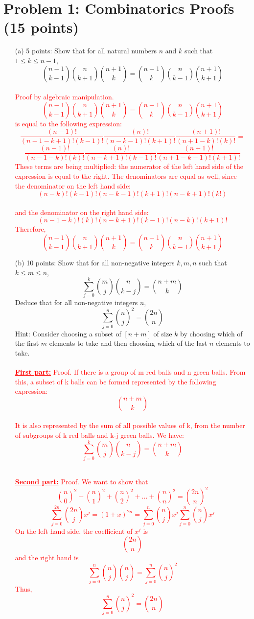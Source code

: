 \documentclass[12pt]{article}
\begin{document}
\section*{Problem 1: Combinatorics Proofs (15 points)}
\begin{enumerate}
\item[(a)] 5 points: Show that for all natural numbers $n$ and $k$ such that $1 \leq k \leq n-1$, 
\[
\binom{n-1}{k-1}\binom{n}{k+1}\binom{n+1}{k} = \binom{n-1}{k}\binom{n}{k-1}\binom{n+1}{k+1}
\]
\\ \textcolor{red}{Proof by algebraic manipulation.  \[\binom{n-1}{k-1}
\binom{n}{k+1}
\binom{n+1}{k} = 
\binom{n-1}{k}
\binom{n}{k-1}
\binom{n+1}{k+1}
\] is equal to the following expression:
\[\frac{(n-1)!}{(n-1-k+1)!(k-1)!}
\frac{(n)!}{(n-k-1)!(k+1)!}
\frac{(n+1)!}{(n+1-k)!(k)!} = \]
\[ \frac{(n-1)!}{(n-1-k)!(k)!}
\frac{(n)!}{(n-k+1)!(k-1)!}
\frac{(n+1)!}{(n+1-k-1)!(k+1)!}
\] 
These terms are being multiplied: the numerator of the left hand side of the expression is equal to the right. The denominators are equal as well, since \\ the denominator on the left hand side: $$(n-k)!(k-1)!(n-k-1)!(k+1)!(n-k+1)!(k!)$$ \\ and the denominator on the right hand side: $$(n-1-k)!(k)!(n-k+1)!(k-1)!(n-k)!(k+1)!$$
Therefore, \[
\binom{n-1}{k-1}\binom{n}{k+1}\binom{n+1}{k} = \binom{n-1}{k}\binom{n}{k-1}\binom{n+1}{k+1}
\] }



\item[(b)] 10 points: Show that for all non-negative integers $k,m,n$ such that $k \leq m \leq n$, 
\[
\sum_{j=0}^{k}{\binom{m}{j}\binom{n}{k-j}} = \binom{n+m}{k}
\]
Deduce that for all non-negative integers $n$, 
\[
\sum_{j=0}^{n}{{\binom{n}{j}}^2} = \binom{2n}{n}
\]
Hint: Consider choosing a subset of $[n+m]$ of size $k$ by choosing which of the first $m$ elements to take and then choosing which of the last $n$ elements to take. \\
\\ \textcolor{red}{\underline{\textbf{First part:}} Proof. If there is a group of m red balls and n green balls. From this, a subset of k balls can be formed represented by the following expression: $$\binom{n+m}{k}$$}
\\ \textcolor{red}{It is also represented by the sum of all possible values of k, from the number of subgroups of k red balls and k-j green balls. We have: $$\sum_{j=0}^{k}{\binom{m}{j}\binom{n}{k-j}} = \binom{n+m}{k}$$}

\\ \textcolor{red}{\underline{\textbf{Second part:}} Proof. We want to show that $$\binom{n}{0}^2 + \binom{n}{1}^2 + \binom{n}{2}^2 + ... + \binom{n}{n}^2 = \binom{2n}{n}^2$$}
\textcolor{red}{$$\sum_{j=0}^{2n}{\binom{2n}{j}x^j = (1+x)^{2n}} = \sum_{j=0}^{n}{\binom{n}{j}x^j}\sum_{j=0}^{n}{\binom{n}{j}x^j}$$ On the left hand side, the coefficient of $x^j$ is $$\binom{2n}{n}$$ and the right hand is $$\sum_{j=0}^{n}{\binom{n}{j}\binom{n}{j} = \sum_{j=0}^{n}{\binom{n}{j}^2}}$$ Thus, $$\sum_{j=0}^{n}{{\binom{n}{j}}^2} = \binom{2n}{n}$$}

\end{enumerate}
\end{document}
